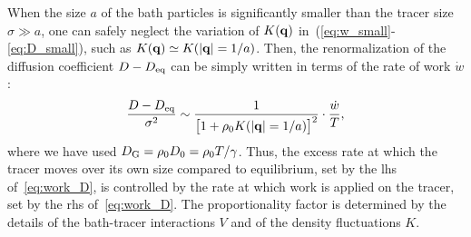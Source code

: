 \documentclass[pre, superscriptaddress, twocolumn,pre]{revtex4-1}
\begin{document}
When the size $a$ of the bath particles is significantly smaller than the tracer size $\sigma\gg a$, one can safely neglect the variation of $K({\bf q})$ in~(\ref{eq:w_small}-\ref{eq:D_small}), such as $K({\bf q}) \simeq K(|{\bf q}|=1/a)$. Then, the renormalization of the diffusion coefficient $D-D_{\rm eq}$ can be simply written in terms of the rate of work $\dot w$: 
\begin{equation}\label{eq:work_D}
	\frac{D-D_{\rm eq}}{\sigma^2} \sim \frac{1}{\big[1+\rho_0K(|{\bf q}|=1/a)\big]^2} \cdot \frac{\dot w}{T} ,
\end{equation}
where we have used $D_{\rm G}=\rho_0 D_0=\rho_0 T/\gamma$. Thus, the excess rate at which the tracer moves over its own size compared to equilibrium, set by the lhs of~\eqref{eq:work_D}, is controlled by the rate at which work is applied on the tracer, set by the rhs of~\eqref{eq:work_D}. The proportionality factor is determined by the details of the bath-tracer interactions $V$ and of the density fluctuations $K$.
\end{document}
